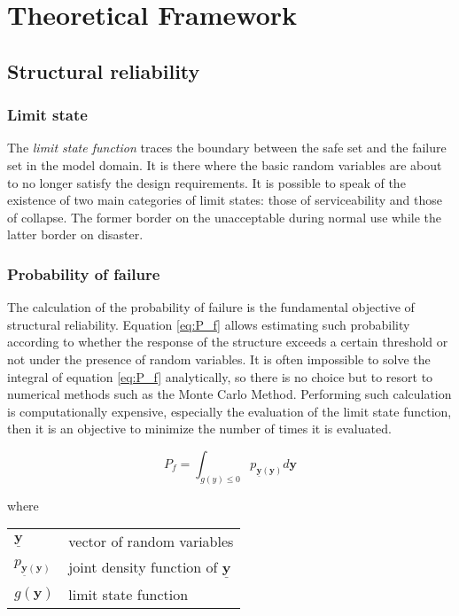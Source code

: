 
\chapter{Theoretical Framework}\label{ch:theoretical_framework}

\section{Structural reliability}

\subsection{Limit state}

The \emph{limit state function} traces the boundary between the safe set and the failure set in the model domain. It is there where the basic random variables are about to no longer satisfy the design requirements. It is possible to speak of the existence of two main categories of limit states: those of serviceability and those of collapse. The former border on the unacceptable during normal use while the latter border on disaster.

\subsection{Probability of failure}

The calculation of the probability of failure is the fundamental objective of structural reliability. Equation \ref{eq:P_f} allows estimating such probability according to whether the response of the structure exceeds a certain threshold or not under the presence of random variables. It is often impossible to solve the integral of equation \ref{eq:P_f} analytically, so there is no choice but to resort to numerical methods such as the Monte Carlo Method. Performing such calculation is computationally expensive, especially the evaluation of the limit state function, then it is an objective to minimize the number of times it is evaluated.

\begin{equation} \label{eq:P_f}
	P_f = \int_{g(y) \leq 0} p_{\mathbf{\underline{y}}(\mathbf{y})} d\mathbf{y}
\end{equation}

where

\begin{tabular}{ll}
	$\mathbf{\underline{y}}$ & vector of random variables \\
	$p_{\mathbf{\underline{y}}(\mathbf{y})}$& joint density function of $\mathbf{\underline{y}}$ \\
	$g(\mathbf{y})$ & limit state function \\
\end{tabular}

